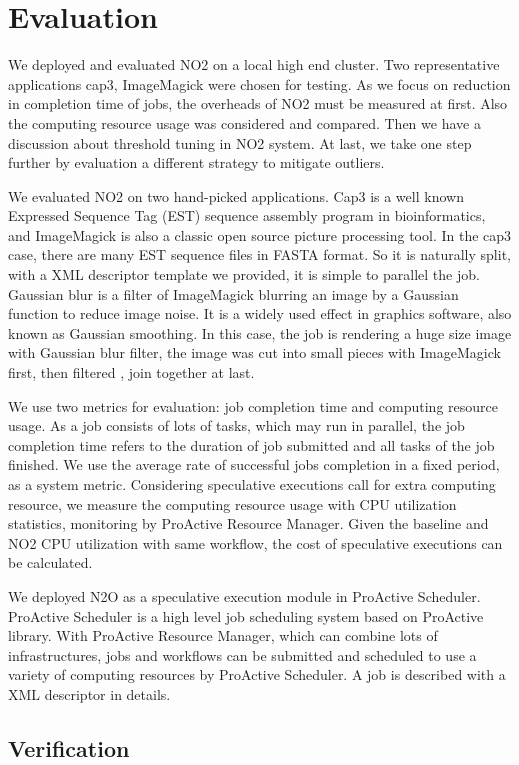 \section{Evaluation}
We deployed and evaluated NO2 on a local high end cluster. Two representative applications cap3, ImageMagick were chosen for testing. As we focus on reduction in completion time of jobs, the overheads of NO2 must be measured at first. Also the computing resource usage was considered and compared. Then we have a discussion about threshold tuning in NO2 system. At last, we take one step further by evaluation a different strategy to mitigate outliers.

We evaluated NO2 on two hand-picked applications. Cap3 is a well known Expressed Sequence Tag (EST) sequence assembly program in bioinformatics, and ImageMagick is also a classic open source picture processing tool. In the cap3 case, there are many EST sequence files in FASTA format. So it is naturally split, with a XML descriptor template we provided, it is simple to parallel the job. Gaussian blur is a filter of ImageMagick blurring an image by a Gaussian function to reduce image noise. It is a widely used effect in graphics software, also known as Gaussian smoothing. In this case, the job is rendering a huge size image with Gaussian blur filter, the image was cut into small pieces with ImageMagick first, then filtered , join together at last.

We use two metrics for evaluation: job completion time and computing resource usage. As a job consists of lots of tasks, which may run in parallel, the job completion time refers to the duration of job submitted and all tasks of the job finished. We use the average rate of successful jobs completion in a fixed period, as a system metric. Considering speculative executions call for extra computing resource, we measure the computing resource usage with CPU utilization statistics, monitoring by ProActive Resource Manager. Given the baseline and NO2 CPU utilization with same workflow, the cost of speculative executions can be calculated.

We deployed N2O as a speculative execution module in ProActive Scheduler. ProActive Scheduler is a high level job scheduling system based on ProActive library. With ProActive Resource Manager, which can combine lots of infrastructures, jobs and workflows can be submitted and scheduled to use a variety of computing resources by ProActive Scheduler. A job is described with a XML descriptor in details.

\subsection{Verification}

